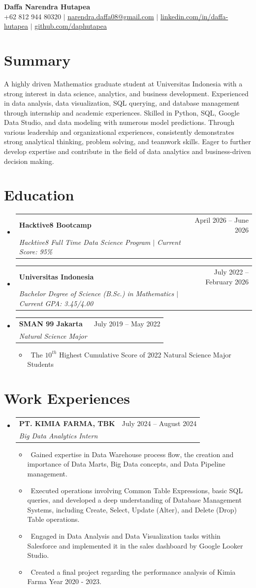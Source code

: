 \documentclass[letterpaper,10pt]{article}
\makeatletter
\newcommand{\resumeItem}[1]{\item\small{#1}}
\newcommand{\resumeSubheading}[4]{
\vspace{-1pt}\item
  \begin{tabular*}{0.97\textwidth}[t]{l@{\extracolsep{\fill}}r}
    \textbf{#1} & #2 \\
    \textit{#3} & \textit{#4} \\
  \end{tabular*}\vspace{-7pt}
}
\newcommand{\resumeSubHeadingList}{\begin{itemize}[leftmargin=0.15in, label={}]}
\newcommand{\resumeSubHeadingListEnd}{\end{itemize}}
\makeatother
\begin{document}
\begin{center}
  \textbf{\Huge Daffa Narendra Hutapea} \\
  \small +62 812 944 80320 $|$ \href{mailto:narendra.daffa08@gmail.com}{narendra.daffa08@gmail.com} $|$ 
  \href{linkedin.com/in/daffa-hutapea}{linkedin.com/in/daffa-hutapea} $|$ \href{https://github.com/daphutapea}{github.com/daphutapea} 
\end{center}

\section*{Summary}
A highly driven Mathematics graduate student at Universitas Indonesia with a strong interest in data science, analytics, and business development. Experienced in data analysis, data visualization, SQL querying, and database management through internship and academic experiences. Skilled in Python, SQL, Google Data Studio, and data modeling with numerous model predictions. Through various leadership and organizational experiences, consistently demonstrates strong analytical thinking, problem solving, and teamwork skills. Eager to further develop expertise and contribute in the field of data analytics and business-driven decision making.

\section{Education}
\resumeSubHeadingList
  \resumeSubheading
      {Hacktive8 Bootcamp}{April 2026 -- June 2026}
      {Hacktive8 Full Time Data Science Program $|$ Current Score: 95\%}{}
  \resumeSubheading
      {Universitas Indonesia}{July 2022 -- February 2026}
      {Bachelor Degree of Science (B.Sc.) in Mathematics $|$ Current GPA: 3.45/4.00}{}
  \resumeSubheading
      {SMAN 99 Jakarta}{July 2019 -- May 2022}
      {Natural Science Major}{}
      \resumeSubHeadingList
          \resumeItem{\textbullet\ The $10^{th}$ Highest Cumulative Score of 2022 Natural Science Major Students}
      \resumeSubHeadingListEnd
\resumeSubHeadingListEnd

\section{Work Experiences}
\resumeSubHeadingList
  \resumeSubheading
      {PT. KIMIA FARMA, TBK}{July 2024 -- August 2024}
      {Big Data Analytics Intern}{}
      \resumeSubHeadingList
          \resumeItem{\textbullet\ Gained expertise in Data Warehouse process flow, the creation and importance of Data Marts, Big Data concepts, and Data Pipeline management.}
          \resumeItem{\textbullet\ Executed operations involving Common Table Expressions, basic SQL queries, and developed a deep understanding of Database Management Systems, including Create, Select, Update (Alter), and Delete (Drop) Table operations.}
          \resumeItem{\textbullet\ Engaged in Data Analysis and Data Visualization tasks within Salesforce and implemented it in the sales dashboard by Google Looker Studio.}
          \resumeItem{\textbullet\ Created a final project regarding the performance analysis of Kimia Farma Year 2020 - 2023.}
      \resumeSubHeadingListEnd
\resumeSubHeadingListEnd
\end{document}
